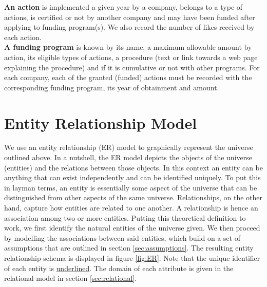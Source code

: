 \textbf{An action} is implemented a given year by a company, belongs to a type of actions, is certified or not by another company
and may have been funded after applying to funding program(s).
We also record the number of likes received by each action. \\

\textbf{A funding program} is known by its name, a maximum allowable amount by action, its eligible types of actions, a procedure
(text or link towards a web page explaining the procedure) and if it is cumulative or not with other programs.
For each company, each of the granted (funded) actions must be recorded with the corresponding funding program, its year of obtainment and amount.


\section{Entity Relationship Model}
We use an entity relationship (ER) model to graphically represent the universe outlined above.
In a nutshell, the ER model depicts the objects of the universe (entities) and the relations between those objects.
In this context an entity can be anything that can exist independently and can be identified uniquely.
To put this in layman terms, an entity is essentially some aspect of the universe that can be distinguished from other
aspects of the same universe.
Relationships, on the other hand, capture how entities are related to one another.
A relationship is hence an association among two or more entities.
Putting this theoretical definition to work, we first identify the natural entities of the universe given.
We then proceed by modelling the associations between said entities, which build on a set of assumptions that are outlined
in section \ref{sec:assumptions}.
The resulting entity relationship schema is displayed in figure \ref{fig:ER}.
Note that the unique identifier of each entity is \underline{underlined}.
The domain of each attribute is given in the relational model in section \ref{sec:relational}.

